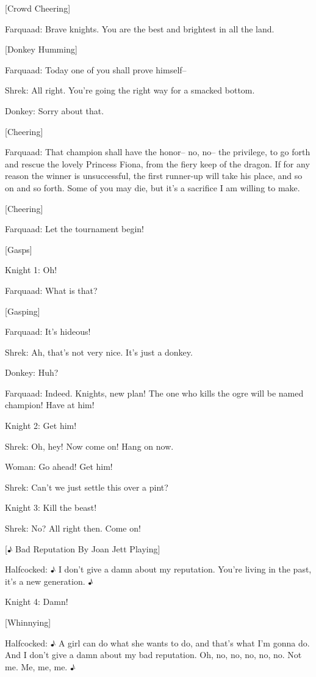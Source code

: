 \documentclass{article}
\begin{document}
[Crowd Cheering]

Farquaad:
Brave knights. You are the best and brightest in all the land.

[Donkey Humming]

Farquaad:
Today one of you shall prove himself--

Shrek:
All right. You're going the right way for a smacked bottom.

Donkey:
Sorry about that.

[Cheering]

Farquaad:
That champion shall have the honor-- no, no-- the privilege, to go forth and rescue the lovely Princess Fiona, from the fiery keep of the dragon. If for any reason the winner is unsuccessful, the first runner-up will take his place, and so on and so forth. Some of you may die, but it's a sacrifice I am willing to make.

[Cheering]

Farquaad:
Let the tournament begin!

[Gasps]

Knight 1:
Oh!

Farquaad:
What is that?

[Gasping]

Farquaad:
It's hideous!

Shrek:
Ah, that's not very nice. It's just a donkey.

Donkey:
Huh?

Farquaad:
Indeed. Knights, new plan! The one who kills the ogre will be named champion! Have at him!

Knight 2:
Get him!

Shrek:
Oh, hey! Now come on! Hang on now.

Woman:
Go ahead! Get him!

Shrek:
Can't we just settle this over a pint?

Knight 3:
Kill the beast!

Shrek:
No? All right then. Come on!

[♪ Bad Reputation By Joan Jett Playing]

Halfcocked:
♪ I don't give a damn about my reputation. You're living in the past, it's a new generation. ♪

Knight 4:
Damn!

[Whinnying]

Halfcocked:
♪ A girl can do what she wants to do, and that's what I'm gonna do. And I don't give a damn about my bad reputation. Oh, no, no, no, no, no. Not me. Me, me, me. ♪
\end{document}
